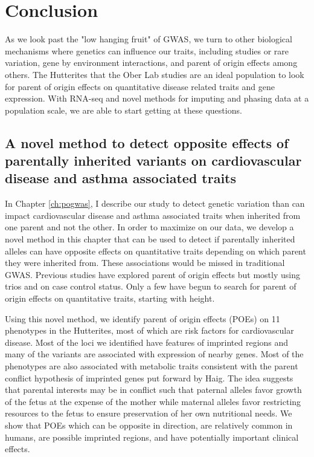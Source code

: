 \chapter{Conclusion}

As we look past the "low hanging fruit" of GWAS, we turn to other biological mechanisms where genetics can influence our traits, including studies or rare variation\cite{Igartua:2017ir}, gene by environment interactions, and parent of origin effects among others. The Hutterites that the Ober Lab studies are an ideal population to look for parent of origin effects on quantitative disease related traits and gene expression\cite{Weiss:2005cq,Abney2001,Ober:2001dy}. With RNA-seq and novel methods for imputing and phasing data at a population scale\citep{Livne2015}, we are able to start getting at these questions. 


\section{A novel method to detect opposite effects of parentally inherited variants on cardiovascular disease and asthma associated traits}
 
 In Chapter \ref{ch:pogwas}, I describe our study to detect genetic variation than can impact cardiovascular disease and asthma associated traits when inherited from one parent and not the other. In order to maximize on our data, we develop a novel method in this chapter that can be used to detect if parentally inherited alleles can have opposite effects on quantitative traits depending on which parent they were inherited from. These associations would be missed in traditional GWAS. Previous studies have explored parent of origin effects but mostly using trios\cite{Garg2012a,Ainsworth:2010bp,Howey:2012hj} and on case control status\cite{Kong:2009kk,Ainsworth:2010bp}. Only a few have begun to search for parent of origin effects on quantitative traits, starting with height\cite{Benonisdottir:2016dz,Zoledziewska:2015do}.
 
Using this novel method, we identify parent of origin effects (POEs) on 11 phenotypes in the Hutterites, most of which are risk factors for cardiovascular disease. Most of the loci we identified have features of imprinted regions and many of the variants are associated with expression of nearby genes. Most of the phenotypes are also associated with metabolic traits consistent with the parent conflict hypothesis of imprinted genes put forward by Haig\citep{Haig:2000if,Barlow:2014dv,Patten:2016cb}. The idea suggests that parental interests may be in conflict such that paternal alleles favor growth of the fetus at the expense of the mother while maternal alleles favor restricting resources to the fetus to ensure preservation of her own nutritional needs. We show that POEs which can be opposite in direction, are relatively common in humans, are possible imprinted regions, and have potentially important clinical effects. 
 
